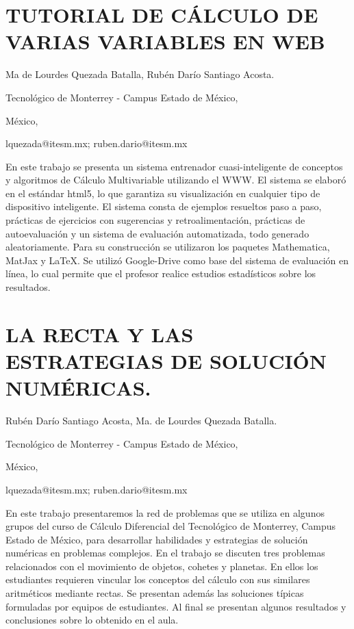 \section{TUTORIAL DE CÁLCULO DE VARIAS VARIABLES EN WEB}

\begin{datos}

Ma de Lourdes Quezada Batalla, Rubén Darío Santiago Acosta.

Tecnológico de Monterrey - Campus Estado de México,

México,

lquezada@itesm.mx; ruben.dario@itesm.mx

\end{datos}

En este trabajo se presenta un sistema entrenador cuasi-inteligente
de conceptos y algoritmos de Cálculo Multivariable utilizando el WWW.
El sistema se elaboró en el estándar html5, lo que garantiza su visualización
en cualquier tipo de dispositivo inteligente. El sistema consta de
ejemplos resueltos paso a paso, prácticas de ejercicios con sugerencias
y retroalimentación, prácticas de autoevaluación y un sistema de evaluación
automatizada, todo generado aleatoriamente. Para su construcción se
utilizaron los paquetes Mathematica, MatJax y \LaTeX{}. Se utilizó
Google-Drive como base del sistema de evaluación en línea, lo cual
permite que el profesor realice estudios estadísticos sobre los resultados. 


\section{LA RECTA Y LAS ESTRATEGIAS DE SOLUCIÓN NUMÉRICAS.}

\begin{datos}

Rubén Darío Santiago Acosta, Ma. de Lourdes Quezada Batalla.

Tecnológico de Monterrey - Campus Estado de México,

México,

lquezada@itesm.mx; ruben.dario@itesm.mx

\end{datos}

En este trabajo presentaremos la red de problemas que se utiliza en
algunos grupos del curso de Cálculo Diferencial del Tecnológico de
Monterrey, Campus Estado de México, para desarrollar habilidades y
estrategias de solución numéricas en problemas complejos. En el trabajo
se discuten tres problemas relacionados con el movimiento de objetos,
cohetes y planetas. En ellos los estudiantes requieren vincular los
conceptos del cálculo con sus similares aritméticos mediante rectas.
Se presentan además las soluciones típicas formuladas por equipos
de estudiantes. Al final se presentan algunos resultados y conclusiones
sobre lo obtenido en el aula.


